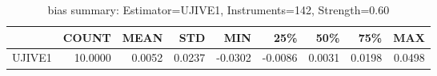 \begin{table}[ht]
\centering
\caption{bias summary: Estimator=UJIVE1, Instruments=142, Strength=0.60}
\begin{tabular}{lrrrrrrrr}
\toprule
 & COUNT & MEAN & STD & MIN & 25\% & 50\% & 75\% & MAX \\
\midrule
UJIVE1 & 10.0000 & 0.0052 & 0.0237 & -0.0302 & -0.0086 & 0.0031 & 0.0198 & 0.0498 \\
\bottomrule
\end{tabular}
\end{table}
